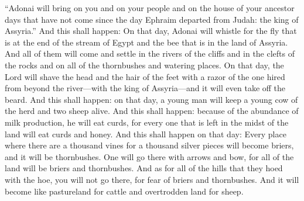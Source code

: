 \begin{biblechapter}
 “Adonai will bring on you and on your people and on the house of your ancestor days that have not come since the day Ephraim departed from Judah: the king of Assyria.”
\verse And this shall happen: On that day, Adonai will whistle for the fly that is at the end of the stream of Egypt and the bee that is in the land of Assyria.
\verse And all of them will come and settle in the rivers of the cliffs and in the clefts of the rocks and on all of the thornbushes and watering places.
\verse On that day, the Lord will shave the head and the hair of the feet with a razor of the one hired from beyond the river—with the king of Assyria—and it will even take off the beard.
\verse And this shall happen: on that day, a young man will keep a young cow of the herd and two sheep alive.
\verse And this shall happen: because of the abundance of milk production, he will eat curds, for every one that is left in the midst of the land will eat curds and honey.
\verse And this shall happen on that day: Every place where there are a thousand vines for a thousand silver pieces will become briers, and it will be thornbushes.
\verse One will go there with arrows and bow, for all of the land will be briers and thornbushes.
\verse And as for all of the hills that they hoed with the hoe, you will not go there, for fear of briers and thornbushes. And it will become like pastureland for cattle and overtrodden land for sheep.
\end{biblechapter}

